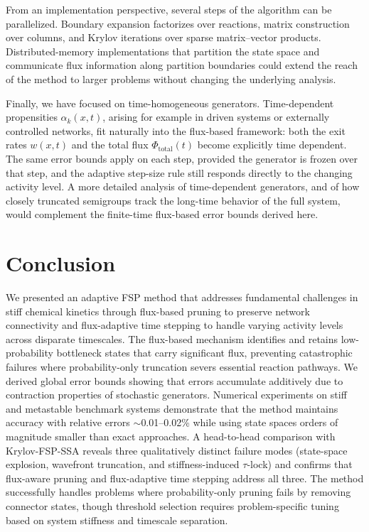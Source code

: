 \documentclass[onefignum,onetabnum]{siamart171218}
\begin{document}
From an implementation perspective, several steps of the algorithm can be parallelized. Boundary expansion factorizes over reactions, matrix construction over columns, and Krylov iterations over sparse matrix–vector products. Distributed-memory implementations that partition the state space and communicate flux information along partition boundaries could extend the reach of the method to larger problems without changing the underlying analysis.

Finally, we have focused on time-homogeneous generators. Time-dependent propensities $\alpha_k(x,t)$, arising for example in driven systems or externally controlled networks, fit naturally into the flux-based framework: both the exit rates $w(x,t)$ and the total flux $\Phi_{\mathrm{total}}(t)$ become explicitly time dependent. The same error bounds apply on each step, provided the generator is frozen over that step, and the adaptive step-size rule still responds directly to the changing activity level. A more detailed analysis of time-dependent generators, and of how closely truncated semigroups track the long-time behavior of the full system, would complement the finite-time flux-based error bounds derived here.



\section{Conclusion}
\label{sec:conclusions}

We presented an adaptive FSP method that addresses fundamental challenges in stiff chemical kinetics through flux-based pruning to preserve network connectivity and flux-adaptive time stepping to handle varying activity levels across disparate timescales. The flux-based mechanism identifies and retains low-probability bottleneck states that carry significant flux, preventing catastrophic failures where probability-only truncation severs essential reaction pathways. We derived global error bounds showing that errors accumulate additively due to contraction properties of stochastic generators. Numerical experiments on stiff and metastable benchmark systems demonstrate that the method maintains accuracy with relative errors $\sim$0.01--0.02\% while using state spaces orders of magnitude smaller than exact approaches. A head-to-head comparison with Krylov-FSP-SSA reveals three qualitatively distinct failure modes (state-space explosion, wavefront truncation, and stiffness-induced $\tau$-lock) and confirms that flux-aware pruning and flux-adaptive time stepping address all three. The method successfully handles problems where probability-only pruning fails by removing connector states, though threshold selection requires problem-specific tuning based on system stiffness and timescale separation.
\end{document}
